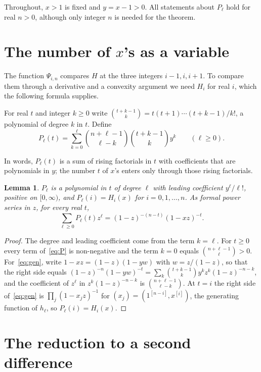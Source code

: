 \documentclass[11pt]{amsart}
\newtheorem{lemma}{Lemma}
\theoremstyle{remark}
\begin{document}
Throughout, $x>1$ is fixed and $y=x-1>0$. All statements about $P_\ell$ hold for real $n>0$, although only integer $n$ is needed for the theorem.

\section{The number of \texorpdfstring{$x$}{x}'s as a variable}\label{sec:poly}

The function $\Psi_{i,n}$ compares $H$ at the three integers $i-1,i,i+1$. To compare them through a derivative and a convexity argument we need $H_i$ for real $i$, which the following formula supplies.

For real $t$ and integer $k\ge0$ write $\binom{t+k-1}{k}=t(t+1)\cdots(t+k-1)/k!$, a polynomial of degree $k$ in $t$. Define
\begin{equation}\label{eq:P}
P_\ell(t)=\sum_{k=0}^{\ell}\binom{n+\ell-1}{\ell-k}\binom{t+k-1}{k}y^k\qquad(\ell\ge0).
\end{equation}

In words, $P_\ell(t)$ is a sum of rising factorials in $t$ with coefficients that are polynomials in $y$; the number $t$ of $x$'s enters only through those rising factorials.

\begin{lemma}\label{lem:P}
$P_\ell$ is a polynomial in $t$ of degree $\ell$ with leading coefficient $y^\ell/\ell!$, positive on $[0,\infty)$, and $P_\ell(i)=H_i(x)$ for $i=0,1,\dots,n$. As formal power series in $z$, for every real $t$,
\begin{equation}\label{eq:gen}
\sum_{\ell\ge0}P_\ell(t)z^\ell=(1-z)^{-(n-t)}(1-xz)^{-t}.
\end{equation}
\end{lemma}

\begin{proof}
The degree and leading coefficient come from the term $k=\ell$. For $t\ge0$ every term of~\eqref{eq:P} is non-negative and the term $k=0$ equals $\binom{n+\ell-1}{\ell}>0$. For~\eqref{eq:gen}, write $1-xz=(1-z)(1-yw)$ with $w=z/(1-z)$, so that the right side equals $(1-z)^{-n}(1-yw)^{-t}=\sum_k\binom{t+k-1}{k}y^kz^k(1-z)^{-n-k}$, and the coefficient of $z^\ell$ in $z^k(1-z)^{-n-k}$ is $\binom{n+\ell-1}{\ell-k}$. At $t=i$ the right side of~\eqref{eq:gen} is $\prod_j(1-x_jz)^{-1}$ for $(x_j)=(1^{[n-i]},x^{[i]})$, the generating function of $h_\ell$, so $P_\ell(i)=H_i(x)$.
\end{proof}

\section{The reduction to a second difference}\label{sec:red}
\end{document}
